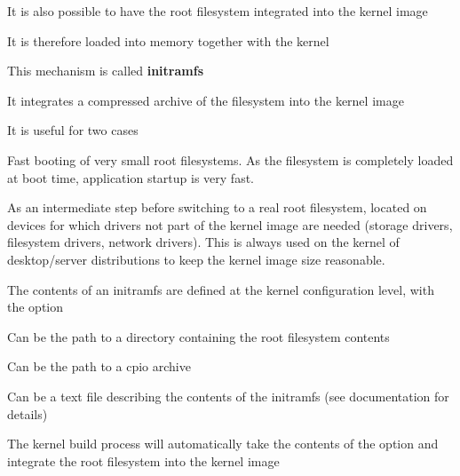 
  \startitemize
  \item It is also possible to have the root filesystem integrated
    into the kernel image
  \item It is therefore loaded into memory together with the kernel
  \item This mechanism is called {\bf initramfs}
    \startitemize
    \item It integrates a compressed archive of the filesystem into
      the kernel image
    \stopitemize
  \item It is useful for two cases
    \startitemize
    \item Fast booting of very small root filesystems. As the
      filesystem is completely loaded at boot time, application
      startup is very fast.
    \item As an intermediate step before switching to a real root
      filesystem, located on devices for which drivers not part of the
      kernel image are needed (storage drivers, filesystem drivers,
      network drivers). This is always used on the kernel of
      desktop/server distributions to keep the kernel image size
      reasonable.
    \stopitemize
  \stopitemize


  \startitemize
  \item The contents of an initramfs are defined at the kernel
    configuration level, with the 
    option
    \startitemize
    \item Can be the path to a directory containing the root
      filesystem contents
    \item Can be the path to a cpio archive
    \item Can be a text file describing the contents of the initramfs
      (see documentation for details)
    \stopitemize
  \item The kernel build process will automatically take the contents
    of the  option and integrate the
    root filesystem into the kernel image
  \item {}\\
  \stopitemize
